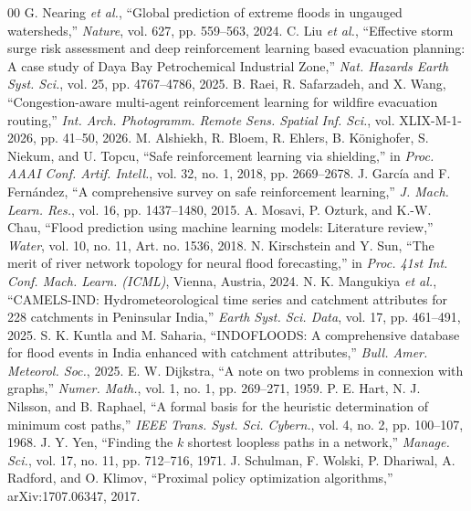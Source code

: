 \documentclass[conference]{IEEEtran}
\begin{document}
\balance
\begin{thebibliography}{00}
 G. Nearing \textit{et al.}, ``Global prediction of extreme floods in ungauged watersheds,'' \textit{Nature}, vol. 627, pp. 559--563, 2024.
 C. Liu \textit{et al.}, ``Effective storm surge risk assessment and deep reinforcement learning based evacuation planning: A case study of Daya Bay Petrochemical Industrial Zone,'' \textit{Nat. Hazards Earth Syst. Sci.}, vol. 25, pp. 4767--4786, 2025.
 B. Raei, R. Safarzadeh, and X. Wang, ``Congestion-aware multi-agent reinforcement learning for wildfire evacuation routing,'' \textit{Int. Arch. Photogramm. Remote Sens. Spatial Inf. Sci.}, vol. XLIX-M-1-2026, pp. 41--50, 2026.
 M. Alshiekh, R. Bloem, R. Ehlers, B. K\"{o}nighofer, S. Niekum, and U. Topcu, ``Safe reinforcement learning via shielding,'' in \textit{Proc. AAAI Conf. Artif. Intell.}, vol. 32, no. 1, 2018, pp. 2669--2678.
 J. Garc\'{i}a and F. Fern\'{a}ndez, ``A comprehensive survey on safe reinforcement learning,'' \textit{J. Mach. Learn. Res.}, vol. 16, pp. 1437--1480, 2015.
 A. Mosavi, P. Ozturk, and K.-W. Chau, ``Flood prediction using machine learning models: Literature review,'' \textit{Water}, vol. 10, no. 11, Art. no. 1536, 2018.
 N. Kirschstein and Y. Sun, ``The merit of river network topology for neural flood forecasting,'' in \textit{Proc. 41st Int. Conf. Mach. Learn. (ICML)}, Vienna, Austria, 2024.
 N. K. Mangukiya \textit{et al.}, ``CAMELS-IND: Hydrometeorological time series and catchment attributes for 228 catchments in Peninsular India,'' \textit{Earth Syst. Sci. Data}, vol. 17, pp. 461--491, 2025.
 S. K. Kuntla and M. Saharia, ``INDOFLOODS: A comprehensive database for flood events in India enhanced with catchment attributes,'' \textit{Bull. Amer. Meteorol. Soc.}, 2025.
 E. W. Dijkstra, ``A note on two problems in connexion with graphs,'' \textit{Numer. Math.}, vol. 1, no. 1, pp. 269--271, 1959.
 P. E. Hart, N. J. Nilsson, and B. Raphael, ``A formal basis for the heuristic determination of minimum cost paths,'' \textit{IEEE Trans. Syst. Sci. Cybern.}, vol. 4, no. 2, pp. 100--107, 1968.
 J. Y. Yen, ``Finding the $k$ shortest loopless paths in a network,'' \textit{Manage. Sci.}, vol. 17, no. 11, pp. 712--716, 1971.
 J. Schulman, F. Wolski, P. Dhariwal, A. Radford, and O. Klimov, ``Proximal policy optimization algorithms,'' arXiv:1707.06347, 2017.

\end{thebibliography}
\end{document}

